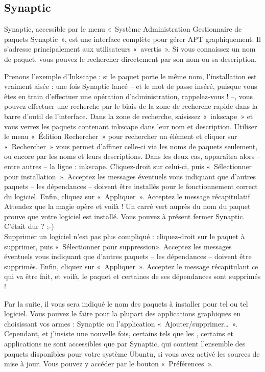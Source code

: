 {\subsection{Synaptic}
\label{RefInstallSynaptic}
Synaptic, accessible par le menu «~Système \FlecheDroite Administration \FlecheDroite Gestionnaire de paquets Synaptic~», est une interface complète pour gérer APT graphiquement. Il s'adresse principalement aux utilisateurs «~avertis~». Si vous connaissez un nom de paquet, vous pouvez le rechercher directement par son nom ou sa description.\par
{}
Prenons l'exemple d'Inkscape : si le paquet porte le même nom, l'installation est vraiment aisée : une fois Synaptic lancé -- et le mot de passe inséré, puisque vous êtes en train d'effectuer une opération d'administration, rappelez-vous ! --, vous pouvez effectuer une recherche par le biais de la zone de recherche rapide dans la barre d'outil de l'interface. Dans la zone de recherche, saisissez «~inkscape~» et vous verrez les paquets contenant inkscape dans leur nom et description. Utiliser le menu «~Édition \FlecheDroite Rechercher~» pour rechercher un élément et cliquer sur «~Rechercher~» vous permet d'affiner celle-ci via les noms de paquets seulement, ou encore par les noms et leurs descriptions. Dans les deux cas, apparaîtra alors -- entre autres -- la ligne : inkscape. Cliquez-droit sur celui-ci, puis «~Sélectionner pour installation~». Acceptez les messages éventuels vous indiquant que d'autres paquets -- les dépendances -- doivent être installés pour le fonctionnement correct du logiciel. Enfin, cliquez sur «~Appliquer~». Acceptez le message récapitulatif. Attendez que la magie opère et voilà ! Un carré vert auprès du nom du paquet prouve que votre logiciel est installé. Vous pouvez à présent fermer Synaptic. C'était dur ? ;-)\\
Supprimer un logiciel n'est pas plus compliqué : cliquez-droit sur le paquet à supprimer, puis «~Sélectionner pour suppression». Acceptez les messages éventuels vous indiquant que d'autres paquets -- les dépendances -- doivent être supprimés. Enfin, cliquez sur «~Appliquer~». Acceptez le message récapitulant ce qui va être fait, et voilà, le paquet et certaines de ses dépendances sont supprimés !
\begin{nota}
Par la suite, il vous sera indiqué le nom des paquets à installer pour tel ou tel logiciel. Vous pouvez le faire pour la plupart des applications graphiques en choisissant vos armes : Synaptic ou l'application «~Ajouter/supprimer\dots{}~». Cependant, et j'insiste une nouvelle fois, certains  tels que les  , certains  et applications ne sont accessibles que par Synaptic, qui contient l'ensemble des paquets disponibles pour votre système Ubuntu, si vous avez activé les sources de mise à jour. Vous pouvez y accéder par le bouton «~Préférences~».\\

\end{nota}}
